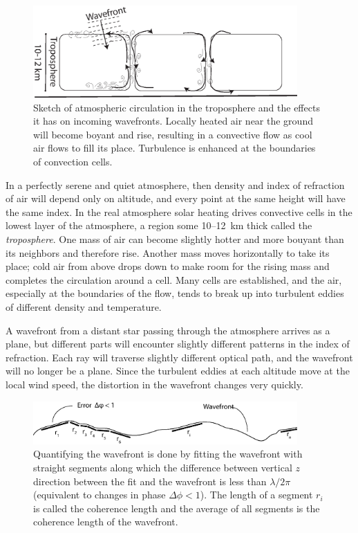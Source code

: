 \begin{figure}[h]
  \centering
	\includegraphics[width=0.9\textwidth]{seeing_global.eps}
  \caption{Sketch of atmospheric circulation in the troposphere and
    the effects it has on incoming wavefronts. Locally heated air near
    the ground will become boyant and rise, resulting in a convective
    flow as cool air flows to fill its place. Turbulence is enhanced
    at the boundaries of convection cells.}
  \label{fig:seeing_global}
\end{figure}

In a perfectly serene and quiet atmosphere, then density and index of
refraction of air will depend only on altitude, and every point at the
same height will have the same index. In the real atmosphere solar
heating drives convective cells in the lowest layer of the atmosphere,
a region some 10--12~km thick called the {\it troposphere}. One mass
of air can become slightly hotter and more bouyant than its neighbors
and therefore rise. Another mass moves horizontally to take its place;
cold air from above drops down to make room for the rising mass and
completes the circulation around a cell. Many cells are established,
and the air, especially at the boundaries of the flow, tends to break
up into turbulent eddies of different density and temperature. 

A wavefront from a distant star passing through the atmosphere arrives
as a plane, but different parts will encounter slightly different
patterns in the index of refraction. Each ray will traverse slightly
different optical path, and the wavefront will no longer be a
plane. Since the turbulent eddies at each altitude move at the local
wind speed, the distortion in the wavefront changes very quickly.

\begin{figure}[h]
  \centering
	\includegraphics[width=0.9\textwidth]{wavefront_rn.eps}
  \caption{Quantifying the wavefront is done by fitting the wavefront
  with straight segments along which the difference between vertical
  $z$ direction between the fit and the wavefront is less than
  $\lambda/2\pi$ (equivalent to changes in phase $\Delta\phi<1$). The
  length of a segment $r_i$ is called the coherence length and the
  average of all segments is the coherence length of the wavefront.}
  \label{fig:wavefront_rn}
\end{figure}

